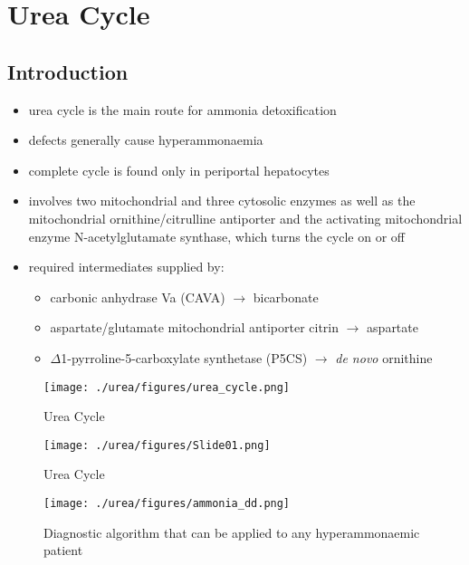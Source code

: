 \documentclass{scrartcl}
\begin{document}
\section{Urea Cycle}
\label{sec:org4776805}
\subsection{Introduction}
\label{sec:orgf4ef396}
\begin{itemize}
\item urea cycle is the main route for ammonia detoxification
\item defects generally cause hyperammonaemia
\item complete cycle is found only in periportal hepatocytes
\item involves two mitochondrial and three cytosolic enzymes as well as
the mitochondrial ornithine/citrulline antiporter and the activating
mitochondrial enzyme N-acetylglutamate synthase, which turns the
cycle on or off
\item required intermediates supplied by:
\begin{itemize}
\item carbonic anhydrase Va (CAVA) \(\to\) bicarbonate
\item aspartate/glutamate mitochondrial antiporter citrin \(\to\) aspartate
\item \(\Delta\)1-pyrroline-5-carboxylate synthetase (P5CS) \(\to\) \emph{de novo} ornithine
\end{itemize}
\end{itemize}

\begin{figure}[htbp]
\centering
\texttt{[image: ./urea/figures/urea\_cycle.png]}
\caption{\label{fig:org1f55cc0}
Urea Cycle}
\end{figure}


\begin{figure}[htbp]
\centering
\texttt{[image: ./urea/figures/Slide01.png]}
\caption{\label{fig:orgee9a0f5}
Urea Cycle}
\end{figure}


\begin{figure}[htbp]
\centering
\texttt{[image: ./urea/figures/ammonia\_dd.png]}
\caption{\label{fig:org8440fc9}
Diagnostic algorithm that can be applied to any hyperammonaemic patient}
\end{figure}
\end{document}
